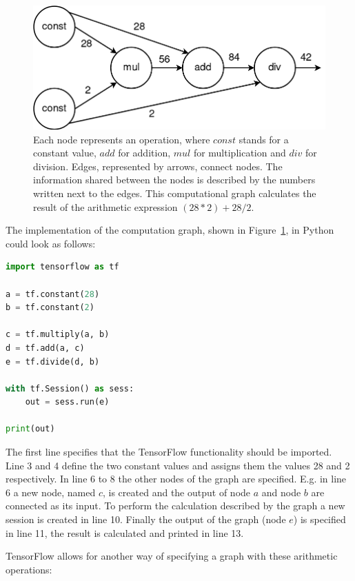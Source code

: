 \begin{figure}[h!]
	\centering
	\includegraphics[width=4.5in]{img/methodology_tensorflow_computationGraph.png}
	\caption{Each node represents an operation, where $const$ stands for a constant value, $add$ for addition, $mul$ for multiplication and $div$ for division. Edges, represented by arrows, connect nodes. The information shared between the nodes is described by the numbers written next to the edges. This computational graph calculates the result of the arithmetic expression $(28 * 2) + 28 / 2$.}
	\label{pic:methodology_tensorflow_computationGraph}
\end{figure}

The implementation of the computation graph, shown in Figure~\ref{pic:methodology_tensorflow_computationGraph}, in Python could look as follows:

\begin{lstlisting}[language=python]
import tensorflow as tf

a = tf.constant(28)
b = tf.constant(2)

c = tf.multiply(a, b)
d = tf.add(a, c)
e = tf.divide(d, b)

with tf.Session() as sess:
    out = sess.run(e)

print(out)
\end{lstlisting}

The first line specifies that the TensorFlow functionality should be imported. Line 3 and 4 define the two constant values and assigns them the values 28 and 2 respectively. In line 6 to 8 the other nodes of the graph are specified. E.g. in line 6 a new node, named $c$, is created and the output of node $a$ and node $b$ are connected as its input. To perform the calculation described by the graph a new session is created in line 10. Finally the output of the graph (node $e$) is specified in line 11, the result is calculated and printed in line 13.

TensorFlow allows for another way of specifying a graph with these arithmetic operations:

